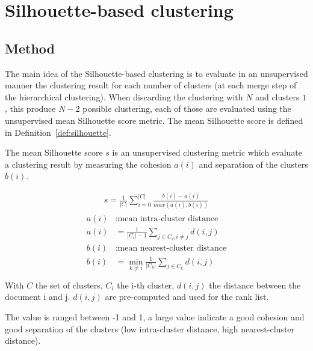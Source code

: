 \section{Silhouette-based clustering\label{sec:silhouette-based_clustering}}

\subsection{Method}

The main idea of the Silhouette-based clustering is to evaluate in an unsupervised manner the clustering result for each number of clusters (at each merge step of the hierarchical clustering).
When discarding the clustering with $N$ and clusters $1$, this produce $N - 2$ possible clustering, each of those are evaluated using the unsupervised mean Silhouette score metric.
The mean Silhouette score is defined in Definition~\ref{def:silhouette}.

\begin{definition}
  \label{def:silhouette}
  The mean Silhouette score $s$ is an unsupervised clustering metric which evaluate a clustering result by measuring the cohesion $a(i)$ and separation of the clusters $b(i)$.

  \begin{gather*}
    s = \frac{1}{|C|} \sum_{i = 0}^{|C|} \frac{b(i) - a(i)}{max(a(i), b(i))}
  \end{gather*}
  \begin{gather*}
    \begin{split}
      a(i)&: \text{mean intra-cluster distance} \\
      a(i)& = \frac{1}{|C_i| - 1} \sum_{j \in C_i, i\neq j} d(i, j) \\
      b(i)&: \text{mean nearest-cluster distance} \\
      b(i)& = \min_{k\neq i} \frac{1}{|C_k|} \sum_{j \in C_k} d(i, j) \\
    \end{split}
  \end{gather*}
  With $C$ the set of clusters, $C_i$ the i-th cluster, $d(i, j)$ the distance between the document i and j.
  $d(i, j)$ are pre-computed and used for the rank list.

  The value is ranged between -1 and 1, a large value indicate a good cohesion and good separation of the clusters (low intra-cluster distance, high nearest-cluster distance).
\end{definition}

